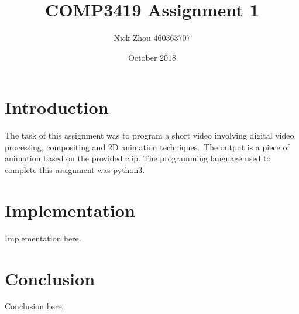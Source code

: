 \documentclass[12pt,a4paper]{article}
\begin{document}
    \begin{titlepage}
        \title{COMP3419 Assignment 1}
        \author{Nick Zhou 460363707}
        \date{October 2018}
        \maketitle
    \end{titlepage}

    \begin{tableofcontents}
        \tableofcontents
        \pagebreak
    \end{tableofcontents}

    \section{Introduction}
    The task of this assignment was to program a short video involving digital video processing, compositing and 2D animation techniques.\
    The output is a piece of animation based on the provided clip. The programming language used to complete this assignment was python3.

    \section{Implementation}
    Implementation here.

    \section{Conclusion}
    Conclusion here.
\end{document}
